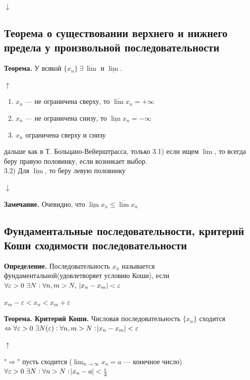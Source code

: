 \documentclass{article}
\begin{document}
    \( \downarrow \)
    
    \subsection{Теорема о существовании верхнего и нижнего предела у произвольной последовательности}
    
    \textbf{Теорема.} У всякой \(\{x_n\}\ \exists\ \overline{\lim}\) и \(\underline{\lim}\).

    \(\uparrow\)
    \begin{enumerate}
        \item \(x_n\) --- не ограничена сверху, то \(\overline{\lim}x_n = +\infty\)
        \item \(x_n\) --- не ограничена снизу, то \(\underline{\lim}x_n = -\infty\)
        \item \(x_n\) ограничена сверху и снизу
    \end{enumerate}

    дальше как в Т. Больцано-Вейерштрасса, только 3.1) если ищем \( \overline{\lim} \), то всегда беру правую половинку, если возникает выбор.
    \\ 3.2) Для \(\underline{\lim}\), то беру левую половинку

    \( \downarrow \)

    \textbf{Замечание.} Очевидно, что \( \underline{\lim}x_n \leq \overline{\lim}x_n\)
    
    \subsection{Фундаментальные последовательности, критерий Коши сходимости последовательности}
    
  	\textbf{Определение.} Последовательность \( x_n \) называется фундаментальной(удовлетворяет условию Коши), если \( \forall \varepsilon > 0\ \exists N: \forall n, m > N,\ \abs{x_n - x_m} < \varepsilon \)
    
    \(x_m - \varepsilon < x_n < x_m + \varepsilon\)

    \textbf{Теорема. Критерий Коши.} Числовая последовательность \( \{x_n\} \) сходится \( \Leftrightarrow \forall \varepsilon > 0\ \exists N(\varepsilon): \forall n, m > N: \abs{x_n - x_m} < \varepsilon \) 

    \(\uparrow\)
    
    "\(\Rightarrow\)" пусть сходится (\(\lim_{n \rightarrow \infty}{x_n} = a\) --- конечное число) \(\forall \varepsilon > 0\ \exists N : \forall n > N: \abs{x_n - a} < \frac{\varepsilon}{2} \)
\end{document}
